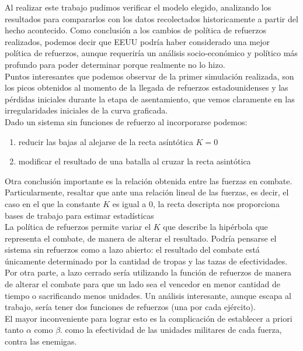 \documentclass{sig-alternate}
\begin{document}
Al realizar este trabajo pudimos verificar el modelo elegido, analizando los resultados para compararlos con los datos recolectados historicamente
a partir del hecho acontecido. Como conclusión a los cambios de política de refuerzos realizados, podemos decir que EEUU podría haber considerado una
mejor política de refuerzos, aunque requeriría un análisis socio-económico y político más profundo para poder determinar porque realmente no
lo hizo.\\
Puntos interesantes que podemos observar de la primer simulación realizada, son los picos obtenidos al momento de la llegada de refuerzos
estadounidenses y las pérdidas iniciales durante la etapa de asentamiento, que vemos claramente en las irregularidades iniciales de la curva 
graficada.\\
Dado un sistema sin funciones de refuerzo al incorporarse podemos:
\begin{enumerate}
\item reducir las bajas al alejarse de la recta asíntótica $K=0$
\item modificar el resultado de una batalla al cruzar la recta asintótica
\end{enumerate} 
Otra conclusión importante es la relación obtenida entre las fuerzas en combate. Particularmente, resaltar que ante una relación lineal de las
fuerzas, es decir, el caso en el que la constante $K$ es igual a $0$, la recta descripta nos proporciona bases de trabajo para estimar estadísticas \\
La política de refuerzos permite variar el $K$ que describe la
hip\'erbola que representa el combate, de manera de alterar el
resultado. Podr\'ia pensarse el sistema sin refuerzos como a lazo
abierto: el resultado del combate está \'unicamente determinado
por la cantidad de tropas y las tazas de efectividades. Por otra
parte, a lazo cerrado ser\'ia utilizando la funci\'on de refuerzos de
manera de alterar el combate para que un lado sea el vencedor en menor
cantidad de tiempo o sacrificando menos unidades. Un análisis interesante, aunque escapa al trabajo, sería tener dos funciones de refuerzos (una por cada ejército). \\
El mayor inconveniente para lograr esto es la complicación de establecer a priori tanto $\alpha$ como $\beta$.
como la efectividad de las unidades militares de cada fuerza, contra las enemigas.
\end{document}
